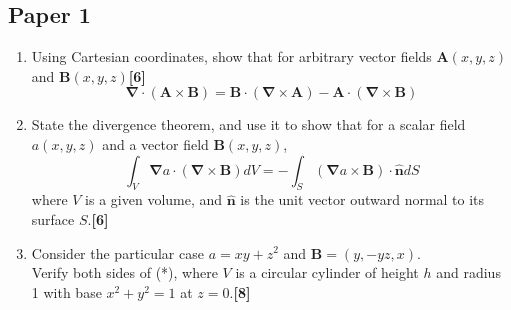 \documentclass[a4paper]{article}
\begin{document}
\subsection{Paper 1}
\begin{qns}\leavevmode
\begin{enumerate}[label=(\roman*)]
    \item Using Cartesian coordinates, show that for arbitrary vector fields $\mathbf{A}(x,y,z)$ and $\mathbf{B}(x,y,z)$\hfill \textbf{[6]}
$$\boldsymbol{\nabla}\cdot(\mathbf{A}\times\mathbf{B})=\mathbf{B}\cdot(\boldsymbol{\nabla}\times\mathbf{A})-\mathbf{A}\cdot(\boldsymbol{\nabla}\times\mathbf{B})$$
\item State the divergence theorem, and use it to show that for a scalar field $a(x,y,z)$ and a vector field $\mathbf{B}(x,y,z)$,
\begin{equation}
  \int_V\boldsymbol{\nabla}a\cdot(\boldsymbol{\nabla}\times\mathbf{B})dV=-\int_S(\boldsymbol{\nabla}a\times\mathbf{B})\cdot\mathbf{\hat{n}}dS\tag{*}  
\end{equation}
where $V$ is a given volume, and $\mathbf{\hat{n}}$ is the unit vector outward normal to its surface $S$.\hfill \textbf{[6]}
\item  Consider the particular case $a=xy+z^2$ and $\mathbf{B}=(y,-yz,x)$.\\[5pt]
Verify both sides of (*), where $V$ is a circular cylinder of height $h$ and radius 1 with base $x^2+y^2=1$ at $z=0$.\hfill \textbf{[8]}
\end{enumerate}
\end{qns}
\end{document}
